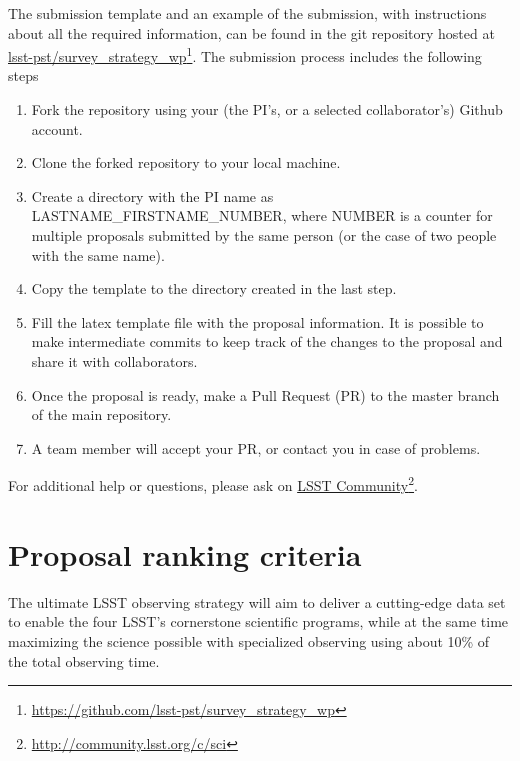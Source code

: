 \documentclass[DM,lsstdraft,toc,usenatbib]{lsstdoc}
\begin{document}
The submission template and an example of the submission, with instructions about
all the required information, can be found in the git repository hosted at \href{https://github.com/lsst-pst/survey_strategy_wp}{lsst-pst/survey\_strategy\_wp}\footnote{\url{https://github.com/lsst-pst/survey_strategy_wp}}.
The submission process includes the following steps
%
\begin{enumerate}
\item Fork the repository using your (the PI's, or a selected collaborator's)  Github account.
\item Clone the forked repository to your local machine.
\item Create a directory with the PI name as LASTNAME\_FIRSTNAME\_NUMBER,
where NUMBER is a counter for multiple proposals submitted by the same person (or the case
of two people with the same name). 
\item Copy the template to the directory created in the last step.
\item Fill the latex template file with the proposal information. It is possible to make intermediate 
          commits to keep track of the changes to the proposal and share it with collaborators.
\item Once the proposal is ready, make a Pull Request (PR) to the master branch of the main repository. 
\item A team member will accept your PR, or contact you in case of problems. 
\end{enumerate}

For additional help or questions, please ask on \href{https://community.lsst.org/c/sci}{LSST Community}\footnote{\url{http://community.lsst.org/c/sci}}. 


\section{Proposal ranking criteria} 

The ultimate LSST observing strategy will aim to deliver a cutting-edge data set to enable
the four LSST's cornerstone scientific programs, while at the same time maximizing the 
science possible with specialized observing using about 10\% of the total observing time. 
\end{document}
